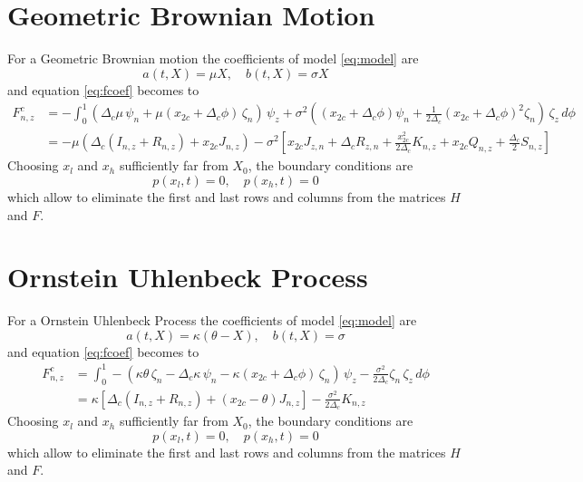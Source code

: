 \documentclass[10pt]{article}
\newcommand {\dv}[1]{\Delta_{#1}}
\newcommand {\dvc}[0]{\dv{c}}
\begin{document}
\section{Geometric Brownian Motion}

For a Geometric Brownian motion the coefficients of model \eqref{eq:model} are
$$
   a(t,X) = \mu X, \quad b(t,X)=\sigma X
$$
and equation \eqref{eq:fcoef} becomes to
\begin{align*}
   F^{c}_{n,z} &= -\int_0^1 (\dvc \mu\, \psi_n+\mu (x_{2c}+\dvc\phi)\,\zeta_n)\,\psi_z +\sigma^2 \left((x_{2c}+\dvc\phi) \psi_n+\frac{1}{2\dvc} (x_{2c}+\dvc\phi) ^2 \zeta_n\right) \,\zeta_z\,d\phi \\
   &= -\mu(\dvc (I_{n,z}+ R_{n,z})+x_{2c}J_{n,z}) -\sigma^2 \left[
      x_{2c}J_{z,n}+\dvc R_{z,n}
        +\frac{x_{2c}^2}{2\dvc}K_{n,z}+x_{2c}Q_{n,z}+\frac{\dvc}{2}S_{n,z}
     \right]
\end{align*}
Choosing $x_l$ and $x_h$ sufficiently far from $X_0$, the boundary conditions are
$$
   p(x_l,t)=0, \quad p(x_h,t)=0
$$
which allow to eliminate the first and last rows and columns from the matrices $H$ and $F$.

\section{Ornstein Uhlenbeck Process}

For a Ornstein Uhlenbeck Process the coefficients of model \eqref{eq:model} are
$$
   a(t,X) = \kappa(\theta-X), \quad b(t,X)=\sigma
$$
and equation \eqref{eq:fcoef} becomes to
\begin{align*}
   F^{c}_{n,z} &= \int_0^1 -(\kappa\theta\,\zeta_n - \dvc \kappa\, \psi_n-\kappa (x_{2c}+\dvc\phi)\,\zeta_n)\,\psi_z -\frac{\sigma^2}{2\dvc} \zeta_n \,\zeta_z\,d\phi\\
   &= \kappa[\dvc (I_{n,z}+ R_{n,z})+(x_{2c}-\theta)J_{n,z}]
     -\frac{\sigma^2}{2\dvc} K_{n,z}
\end{align*}
Choosing $x_l$ and $x_h$ sufficiently far from $X_0$, the boundary conditions are
$$
   p(x_l,t)=0, \quad p(x_h,t)=0
$$
which allow to eliminate the first and last rows and columns from the matrices $H$ and $F$.
\end{document}
